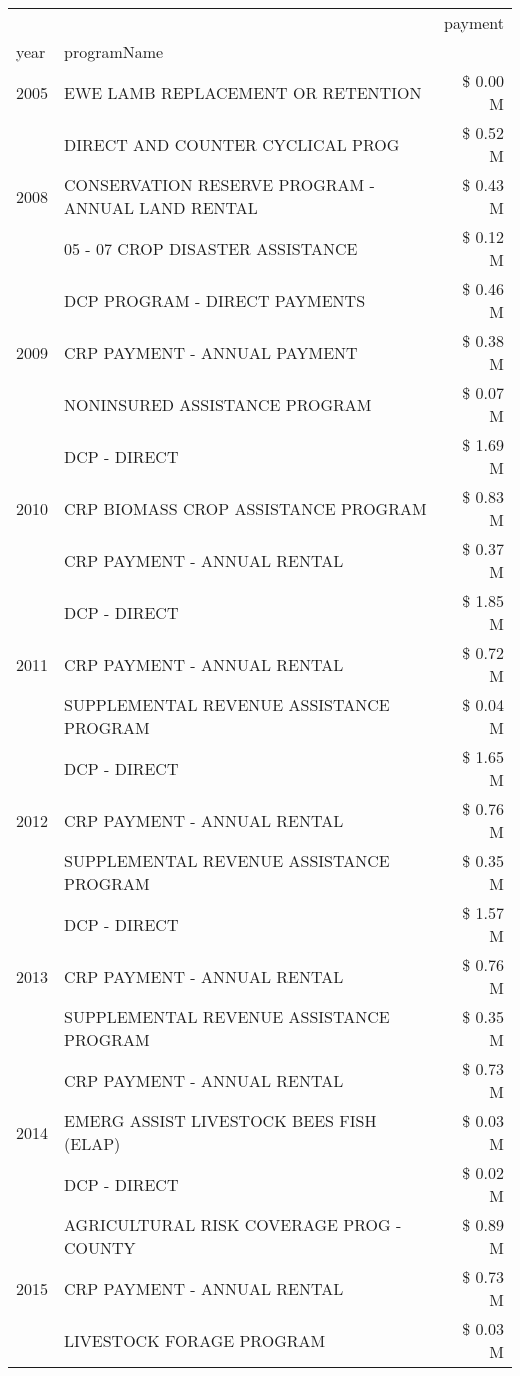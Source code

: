 \begin{tabular}{llr}
\toprule
 &  & payment \\
year & programName &  \\
\midrule
2005 & EWE LAMB REPLACEMENT OR RETENTION & \$ 0.00 M \\
\cline{1-3}
\multirow[t]{3}{*}{2008} & DIRECT AND COUNTER CYCLICAL PROG & \$ 0.52 M \\
 & CONSERVATION RESERVE PROGRAM - ANNUAL LAND RENTAL & \$ 0.43 M \\
 & 05 - 07 CROP DISASTER ASSISTANCE & \$ 0.12 M \\
\cline{1-3}
\multirow[t]{3}{*}{2009} & DCP PROGRAM - DIRECT PAYMENTS & \$ 0.46 M \\
 & CRP PAYMENT - ANNUAL PAYMENT & \$ 0.38 M \\
 & NONINSURED ASSISTANCE PROGRAM & \$ 0.07 M \\
\cline{1-3}
\multirow[t]{3}{*}{2010} & DCP - DIRECT & \$ 1.69 M \\
 & CRP BIOMASS CROP ASSISTANCE PROGRAM & \$ 0.83 M \\
 & CRP PAYMENT - ANNUAL RENTAL & \$ 0.37 M \\
\cline{1-3}
\multirow[t]{3}{*}{2011} & DCP - DIRECT & \$ 1.85 M \\
 & CRP PAYMENT - ANNUAL RENTAL & \$ 0.72 M \\
 & SUPPLEMENTAL REVENUE ASSISTANCE PROGRAM & \$ 0.04 M \\
\cline{1-3}
\multirow[t]{3}{*}{2012} & DCP - DIRECT & \$ 1.65 M \\
 & CRP PAYMENT - ANNUAL RENTAL & \$ 0.76 M \\
 & SUPPLEMENTAL REVENUE ASSISTANCE PROGRAM & \$ 0.35 M \\
\cline{1-3}
\multirow[t]{3}{*}{2013} & DCP - DIRECT & \$ 1.57 M \\
 & CRP PAYMENT - ANNUAL RENTAL & \$ 0.76 M \\
 & SUPPLEMENTAL REVENUE ASSISTANCE PROGRAM & \$ 0.35 M \\
\cline{1-3}
\multirow[t]{3}{*}{2014} & CRP PAYMENT - ANNUAL RENTAL & \$ 0.73 M \\
 & EMERG ASSIST LIVESTOCK BEES FISH (ELAP) & \$ 0.03 M \\
 & DCP - DIRECT & \$ 0.02 M \\
\cline{1-3}
\multirow[t]{3}{*}{2015} & AGRICULTURAL RISK COVERAGE PROG - COUNTY & \$ 0.89 M \\
 & CRP PAYMENT - ANNUAL RENTAL & \$ 0.73 M \\
 & LIVESTOCK FORAGE PROGRAM & \$ 0.03 M \\

\end{tabular}
